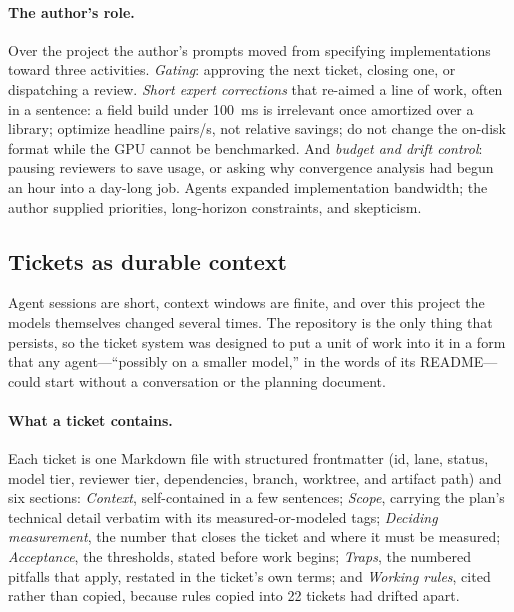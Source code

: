 \paragraph{The author's role.} Over the project the author's prompts moved from
specifying implementations toward three activities. \emph{Gating}: approving
the next ticket, closing one, or dispatching a review. \emph{Short expert
corrections} that re-aimed a line of work, often in a sentence: a field build
under 100~ms is irrelevant once amortized over a library; optimize headline
pairs/s, not relative savings; do not change the on-disk format while the GPU
cannot be benchmarked. And \emph{budget and drift control}: pausing reviewers to
save usage, or asking why convergence analysis had begun an hour into a
day-long job. Agents expanded implementation bandwidth; the author supplied
priorities, long-horizon constraints, and skepticism.

\subsection{Tickets as durable context}

Agent sessions are short, context windows are finite, and over this project the
models themselves changed several times. The repository is the only thing that
persists, so the ticket system was designed to put a unit of work into it in a
form that any agent---``possibly on a smaller model,'' in the words of its
README---could start without a conversation or the planning document.

\paragraph{What a ticket contains.} Each ticket is one Markdown file with
structured frontmatter (id, lane, status, model tier, reviewer tier,
dependencies, branch, worktree, and artifact path) and six sections:
\emph{Context}, self-contained in a few sentences; \emph{Scope}, carrying the
plan's technical detail verbatim with its measured-or-modeled tags;
\emph{Deciding measurement}, the number that closes the ticket and where it must
be measured; \emph{Acceptance}, the thresholds, stated before work begins;
\emph{Traps}, the numbered pitfalls that apply, restated in the ticket's own
terms; and \emph{Working rules}, cited rather than copied, because rules copied
into 22 tickets had drifted apart.

